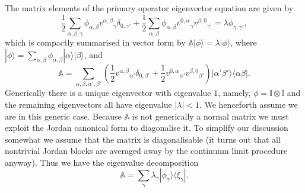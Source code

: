 \documentclass[prl,twocolumn,lengthcheck,superscriptaddress]{revtex4-1}
\theoremstyle{definition}
\theoremstyle{remark}
\begin{document}
The matrix elements of the primary operator eigenvector equation are given by
\begin{equation}
	\frac12\sum_{\alpha,\beta,\gamma} \phi_{\alpha,\beta} {v^{\alpha,\beta}}_{\gamma} \delta_{0,\gamma'} + \frac12 \sum_{\alpha,\beta} \phi_{\alpha,\beta} {v^{0,\alpha}}_{\gamma} {v^{\beta,0}}_{\gamma'} = \lambda\phi_{\gamma,\gamma'},
\end{equation}
which is compactly summarised in vector form by $\mathbb{A}|\phi\rangle = \lambda |\phi\rangle$, where $|\phi\rangle = \sum_{\alpha,\beta} \phi_{\alpha,\beta}|\alpha\rangle|\beta\rangle$, and
\begin{equation}
	\mathbb{A} = \sum_{\alpha,\beta,\alpha',\beta'} \left(\frac{1}{2} {v^{\alpha,\beta}}_{\alpha'} \delta_{0,\beta'} + \frac12{v^{0,\alpha}}_{\alpha'} {v^{\beta,0}}_{\beta'}\right)|\alpha'\beta'\rangle\langle\alpha\beta|.
\end{equation}
Generically there is a unique eigenvector with eigenvalue $1$, namely, $\phi = \mathbb{I}\otimes \mathbb{I}$ and the remaining eigenvectors all have eigenvalue $|\lambda| < 1$. We henceforth assume we are in this generic case. Because $\mathbb{A}$ is not generically a normal matrix we must exploit the Jordan canonical form to diagonalise it. To simplify our discussion somewhat we assume that the matrix is diagonalisable (it turns out that all nontrivial Jordan blocks are averaged away by the continuum limit procedure anyway). Thus we have the eigenvalue decomposition
\begin{equation}
	\mathbb{A} = \sum_{\gamma} \lambda_\gamma |\phi_\gamma\rangle\langle \xi_\gamma|.
\end{equation}
\end{document}
